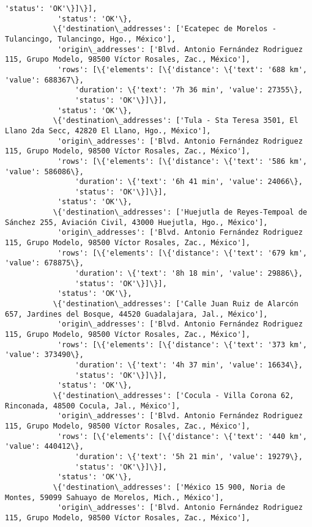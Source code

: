 \documentclass[11pt]{article}
\begin{document}
\begin{Verbatim}[commandchars=\\\{\}]
                'status': 'OK'\}]\}],
            'status': 'OK'\},
           \{'destination\_addresses': ['Ecatepec de Morelos - Tulancingo, Tulancingo, Hgo., México'],
            'origin\_addresses': ['Blvd. Antonio Fernández Rodriguez 115, Grupo Modelo, 98500 Víctor Rosales, Zac., México'],
            'rows': [\{'elements': [\{'distance': \{'text': '688 km', 'value': 688367\},
                'duration': \{'text': '7h 36 min', 'value': 27355\},
                'status': 'OK'\}]\}],
            'status': 'OK'\},
           \{'destination\_addresses': ['Tula - Sta Teresa 3501, El Llano 2da Secc, 42820 El Llano, Hgo., México'],
            'origin\_addresses': ['Blvd. Antonio Fernández Rodriguez 115, Grupo Modelo, 98500 Víctor Rosales, Zac., México'],
            'rows': [\{'elements': [\{'distance': \{'text': '586 km', 'value': 586086\},
                'duration': \{'text': '6h 41 min', 'value': 24066\},
                'status': 'OK'\}]\}],
            'status': 'OK'\},
           \{'destination\_addresses': ['Huejutla de Reyes-Tempoal de Sánchez 255, Aviación Civil, 43000 Huejutla, Hgo., México'],
            'origin\_addresses': ['Blvd. Antonio Fernández Rodriguez 115, Grupo Modelo, 98500 Víctor Rosales, Zac., México'],
            'rows': [\{'elements': [\{'distance': \{'text': '679 km', 'value': 678875\},
                'duration': \{'text': '8h 18 min', 'value': 29886\},
                'status': 'OK'\}]\}],
            'status': 'OK'\},
           \{'destination\_addresses': ['Calle Juan Ruiz de Alarcón 657, Jardines del Bosque, 44520 Guadalajara, Jal., México'],
            'origin\_addresses': ['Blvd. Antonio Fernández Rodriguez 115, Grupo Modelo, 98500 Víctor Rosales, Zac., México'],
            'rows': [\{'elements': [\{'distance': \{'text': '373 km', 'value': 373490\},
                'duration': \{'text': '4h 37 min', 'value': 16634\},
                'status': 'OK'\}]\}],
            'status': 'OK'\},
           \{'destination\_addresses': ['Cocula - Villa Corona 62, Rinconada, 48500 Cocula, Jal., México'],
            'origin\_addresses': ['Blvd. Antonio Fernández Rodriguez 115, Grupo Modelo, 98500 Víctor Rosales, Zac., México'],
            'rows': [\{'elements': [\{'distance': \{'text': '440 km', 'value': 440412\},
                'duration': \{'text': '5h 21 min', 'value': 19279\},
                'status': 'OK'\}]\}],
            'status': 'OK'\},
           \{'destination\_addresses': ['México 15 900, Noria de Montes, 59099 Sahuayo de Morelos, Mich., México'],
            'origin\_addresses': ['Blvd. Antonio Fernández Rodriguez 115, Grupo Modelo, 98500 Víctor Rosales, Zac., México'],

\end{Verbatim}
\end{document}
